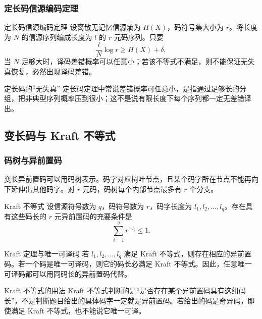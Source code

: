 \subsubsection{定长码信源编码定理}

\begin{theoremBox}{定长码信源编码定理}
设离散无记忆信源熵为 $H(X)$，码符号集大小为 $r$。将长度为 $N$ 的信源序列编成长度为 $l$ 的 $r$ 元码序列。只要
\[
\frac{l}{N}\log r \ge H(X)+\delta,
\]
当 $N$ 足够大时，译码差错概率可以任意小；若该不等式不满足，则不能保证无失真恢复，必然出现译码差错。
\end{theoremBox}

\begin{warningBox}{定长码的“无失真”}
定长码定理中常说差错概率可任意小，是指通过足够长的分组，把非典型序列概率压到很小；这不是说有限长度下每个序列都一定无差错译出。
\end{warningBox}

\subsection{变长码与 Kraft 不等式}

\subsubsection{码树与异前置码}
变长异前置码可以用码树表示。码字对应树叶节点，且某个码字所在节点不能再向下延伸出其他码字。对 $r$ 元码，码树每个内部节点最多有 $r$ 个分支。

\begin{formulaBox}{Kraft 不等式}
设信源符号数为 $q$，码符号数为 $r$，码字长度为 $l_1,l_2,\dots,l_q$。存在具有这些码长的 $r$ 元异前置码的充要条件是
\[
\sum_{i=1}^{q} r^{-l_i}\le 1.
\]
\end{formulaBox}

\begin{theoremBox}{Kraft 定理与唯一可译码}
若 $l_1,l_2,\dots,l_q$ 满足 Kraft 不等式，则存在相应的异前置码。若一个码是唯一可译码，则它的码长必满足 Kraft 不等式。因此，任意唯一可译码都可以用同码长的异前置码代替。
\end{theoremBox}

\begin{warningBox}{Kraft 不等式的用法}
Kraft 不等式判断的是“是否存在某个异前置码具有这组码长”，不是判断题目给出的具体码字一定就是异前置码。若给出的码是奇异码，即使满足 Kraft 不等式，也不能说它唯一可译。
\end{warningBox}

